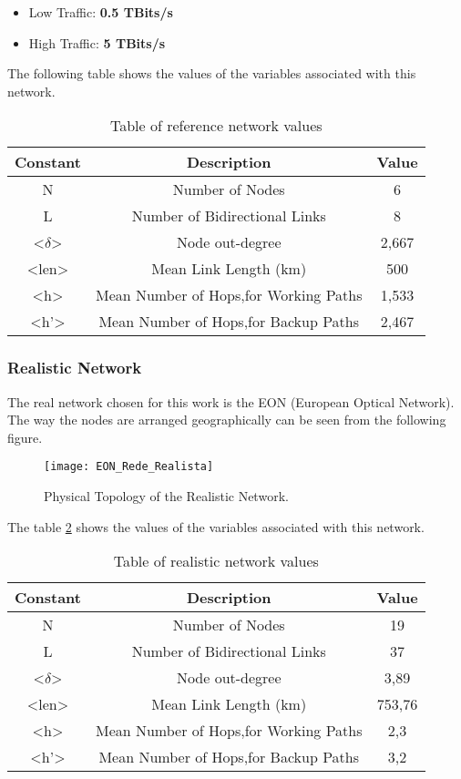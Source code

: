 \begin{itemize}
  \item Low Traffic: \textbf{0.5 TBits/s}
  \item High Traffic: \textbf{5 TBits/s}
\end{itemize}

\begin{table}[h!]
The following table shows the values of the variables associated with this network.\vspace{10pt}
\centering
\begin{tabular}{|| c | c | c||}
 \hline
 Constant & Description & Value \\
 \hline\hline
 N & Number of Nodes & 6 \\
 L & Number of Bidirectional Links & 8 \\
 <$\delta$> & Node out-degree & 2,667 \\
 <len> & Mean Link Length (km) & 500 \\
 <h> & Mean Number of Hops,for Working Paths & 1,533 \\
 <h'> & Mean Number of Hops,for Backup Paths & 2,467 \\
 \hline
\end{tabular}
\caption{Table of reference network values}
\label{table:3}
\end{table}



\subsubsection{Realistic Network}
The real network chosen for this work is the EON (European Optical Network).
The way the nodes are arranged geographically can be seen from the following figure.

\begin{figure}[h!]
\centering
\texttt{[image: EON\_Rede\_Realista]}
\caption{Physical Topology of the Realistic Network.}
\end{figure}

\begin{table}[h!]
The table \ref{table:4} shows the values of the variables associated with this network.\vspace{10pt}
\centering
\begin{tabular}{|| c | c | c||}
 \hline
 Constant & Description & Value \\
 \hline\hline
 N & Number of Nodes & 19 \\
 L & Number of Bidirectional Links & 37 \\
 <$\delta$> & Node out-degree & 3,89 \\
 <len> & Mean Link Length (km) & 753,76 \\
 <h> & Mean Number of Hops,for Working Paths & 2,3 \\
 <h'> & Mean Number of Hops,for Backup Paths & 3,2 \\
 \hline
\end{tabular}
\caption{Table of realistic network values}
\label{table:4}
\end{table}

